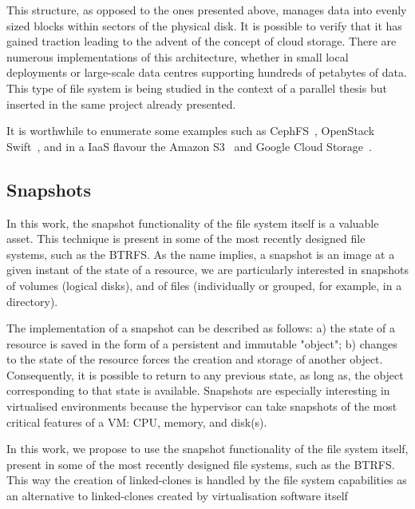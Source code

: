 This structure, as opposed to the ones presented above, manages data into evenly sized blocks within sectors of the physical disk. It is possible to verify that it has gained traction leading to the advent of the concept of cloud storage. There are numerous implementations of this architecture, whether in small local deployments or large-scale data centres supporting hundreds of petabytes of data.
This type of file system is being studied in the context of a parallel thesis but inserted in the same project already presented.

It is worthwhile to enumerate some examples such as CephFS~\cite{Weil2006}, OpenStack Swift~\cite{Swift2017}, and in a IaaS flavour the Amazon S3~\cite{aws_s3} and Google Cloud Storage~\cite{gcp_storage}.


\subsection{Snapshots} %
\label{sub:snapshots}

In this work, the snapshot functionality of the file system itself is a valuable asset. This technique is present in some of the most recently designed file systems, such as the BTRFS. 
As the name implies, a snapshot is an image at a given instant of the state of a resource,  we are particularly interested in snapshots of volumes (logical disks), and of files (individually or grouped, for example, in a directory).

The implementation of a snapshot can be described as follows: a) the state of a resource is saved in the form of a persistent and immutable "object"; b) changes to the state of the resource forces the creation and storage of another object. Consequently, it is possible to return to any previous state, as long as, the object corresponding to that state is available. Snapshots are especially interesting in virtualised environments because the hypervisor can take snapshots of the most critical features of a VM: CPU, memory, and disk(s). 

In this work, we propose to use the snapshot functionality of the file system itself, present in some of the most recently designed file systems, such as the BTRFS. This way the creation of linked-clones is handled by the file system capabilities as an alternative to linked-clones created by virtualisation software itself

